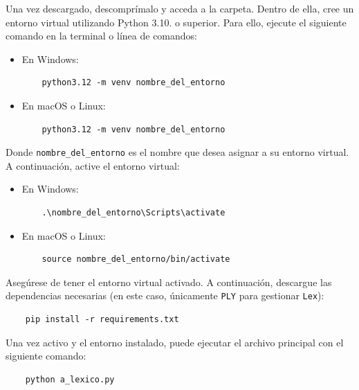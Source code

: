 \documentclass{article}
\begin{document}
Una vez descargado, descomprímalo y acceda a la carpeta. Dentro de ella, cree un 
entorno virtual utilizando Python 3.10. o superior. Para ello, ejecute el siguiente 
comando en 
la terminal o línea de comandos:

\begin{itemize}
  \item En Windows:
        \begin{verbatim}
    python3.12 -m venv nombre_del_entorno
  \end{verbatim}
  \item En macOS o Linux:
        \begin{verbatim}
    python3.12 -m venv nombre_del_entorno
  \end{verbatim}
\end{itemize}

Donde \texttt{nombre\_del\_entorno} es el nombre que desea asignar a su entorno virtual.
A continuación, active el entorno virtual:

\begin{itemize}
  \item En Windows:
        \begin{verbatim}
    .\nombre_del_entorno\Scripts\activate
  \end{verbatim}
  \item En macOS o Linux:
        \begin{verbatim}
    source nombre_del_entorno/bin/activate
  \end{verbatim}
\end{itemize}

Asegúrese de tener el entorno virtual activado. 
A continuación, descargue las dependencias necesarias 
(en este caso, únicamente \texttt{PLY} para gestionar \texttt{Lex}):

\begin{verbatim}
    pip install -r requirements.txt
\end{verbatim}

Una vez activo y el entorno instalado, puede ejecutar el archivo 
principal con el siguiente comando:

\begin{center}
  \begin{adjustbox}{minipage=\linewidth, center}
  \begin{verbatim}
    python a_lexico.py
  \end{verbatim}
  \end{adjustbox}
\end{center}
\end{document}
